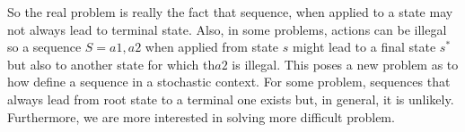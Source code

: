 So the real problem is really the fact that sequence, when applied to a state may not always lead to terminal state.
Also, in some problems, actions can be illegal so a sequence \(S={a1, a2}\) when applied from state \(s\) might lead to a final state \(s^{*}\) but also to another state for which th\(a2\) is illegal.
This poses a new problem as to how define a sequence in a stochastic context.
For some problem, sequences that always lead from root state to a terminal one exists but, in general, it is unlikely.
Furthermore, we are more interested in solving more difficult problem.

